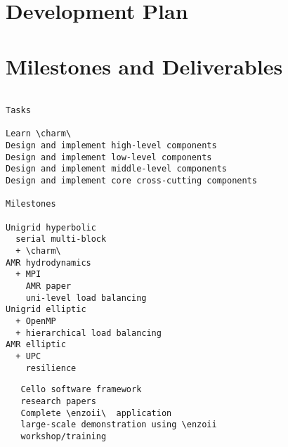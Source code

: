\documentclass[10pt,twocolumn]{article}
\begin{document}

\section{Development Plan} \label{s:plan}

\section{Milestones and Deliverables} \label{s:milestones}

{\tiny
\begin{verbatim}

Tasks

Learn \charm\ 
Design and implement high-level components
Design and implement low-level components
Design and implement middle-level components
Design and implement core cross-cutting components

Milestones

Unigrid hyperbolic
  serial multi-block
  + \charm\ 
AMR hydrodynamics
  + MPI
    AMR paper
    uni-level load balancing
Unigrid elliptic
  + OpenMP
  + hierarchical load balancing
AMR elliptic
  + UPC
    resilience
\end{verbatim}
\begin{verbatim}
   Cello software framework
   research papers
   Complete \enzoii\  application
   large-scale demonstration using \enzoii
   workshop/training
\end{verbatim}
}

\tiny


\end{document}
